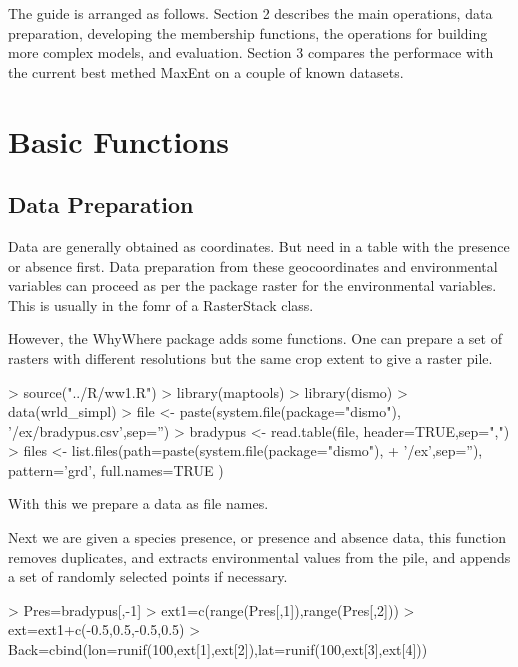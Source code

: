 \documentclass{article}
\begin{document}
The guide is arranged as follows.  Section 2 describes the main operations, data preparation, developing the membership functions, the operations for building more complex models, and evaluation.  Section 3 compares the performace with the current best methed MaxEnt on a couple of known datasets.

\section{Basic Functions}

\subsection{Data Preparation}

Data are generally obtained as coordinates.  But need in a table with the presence or absence first.  Data preparation from these geocoordinates and environmental variables can proceed  as per the package raster for the environmental variables.  This is usually in the fomr of a RasterStack class.

However, the WhyWhere package adds some functions.  One can prepare a set of rasters with different resolutions but the same crop extent to give a raster pile.  


\begin{Schunk}
\begin{Sinput}
> source("../R/ww1.R")
> library(maptools)
> library(dismo)
> data(wrld_simpl)
> file <- paste(system.file(package="dismo"), '/ex/bradypus.csv',sep='')
> bradypus <- read.table(file, header=TRUE,sep=",")
> files <- list.files(path=paste(system.file(package="dismo"), 
+     '/ex',sep=''), pattern='grd', full.names=TRUE )
\end{Sinput}
\end{Schunk}

With this we prepare a data as file names.  

Next we are given a species presence, or presence and absence data, this function removes duplicates, and extracts environmental values from the pile, and appends a set of randomly selected points if necessary.

\begin{Schunk}
\begin{Sinput}
> Pres=bradypus[,-1]
> ext1=c(range(Pres[,1]),range(Pres[,2]))
> ext=ext1+c(-0.5,0.5,-0.5,0.5)
> Back=cbind(lon=runif(100,ext[1],ext[2]),lat=runif(100,ext[3],ext[4]))
\end{Sinput}
\end{Schunk}
\end{document}
